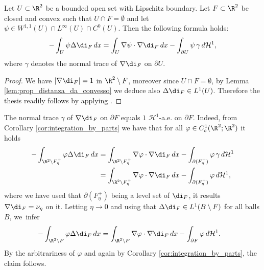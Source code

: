 \begin{cor}\label{cor:integration_by_parts}
Let $U\subset\R^2$ be a bounded open set with Lipschitz boundary. Let $F\subset\R^2$ be closed and convex such that $U\cap F=\emptyset$ and let $\psi\in W^{1,1}(U)\cap L^\infty(U)\cap C^0(U)$. Then the following formula holds:
\begin{equation*}
\begin{split}
- \int_{U}\psi\Delta\di_{F}\,dx
=
\int_{U} \nabla\psi\cdot\nabla\di_{F}\,dx- \int_{\partial U}\psi\,\gamma\,d\mathcal{H}^1,
\end{split}
\end{equation*}
where $\gamma$ denotes the normal trace of $\nabla\di_F$ on $\partial U$.
\end{cor}

\begin{proof}
We have $|\nabla \di_F|=1$ in $\R^2\setminus F$, moreover since $U\cap F=\emptyset$, by
Lemma \ref{lem:prop_distanza_da_convesso} we deduce also $\Delta\di_F\in L^1(U)$. Therefore the thesis readily follows by applying \hbox{\cite[Th.\,1.9]{A}}.
\end{proof}

\begin{remark}\label{rem:traccia}
The normal trace $\gamma$ of $\nabla\di_F$ on $\partial F$ equals $1$ $\mathcal H^1$-a.e. on $\partial F$. Indeed, from Corollary \ref{cor:integration_by_parts} we have that for all $\varphi\in C^1_c(\R^2;\R^2)$ it holds
\begin{align}
- \int_{\R^2\setminus F^+_\eta}\varphi\Delta\di_{F}\,dx
&=
\int_{\R^2\setminus F^+_\eta} \nabla\varphi\cdot\nabla\di_{F}\,dx- \int_{\partial(F_\eta^+)}\varphi\,\gamma\,d\mathcal{H}^1\nonumber\\
&=\int_{\R^2\setminus F^+_\eta} \nabla\varphi\cdot\nabla\di_{F}\,dx- \int_{\partial(F_\eta^+)}\varphi\,d\mathcal{H}^1,\nonumber
\end{align}
where we have used that $\partial (F_\eta^+)$ being a level set of $\di_F$, it results $\nabla\di_F=\nu_\eta$ on it.
Letting $\eta\to 0$ and using that $\Delta \di_F\in L^1(B\setminus F)$ for all balls $B$, we~infer
\begin{align}
-\int_{\R^2\setminus F}\varphi\Delta\di_{F}\,dx
&=
\int_{\R^2\setminus F} \nabla\varphi\cdot\nabla\di_{F}\,dx- \int_{\partial F}\varphi\,d\mathcal{H}^1.\nonumber
\end{align}
By the arbitrariness of $\varphi$ and again by Corollary \ref{cor:integration_by_parts}, the claim follows.
\end{remark}


